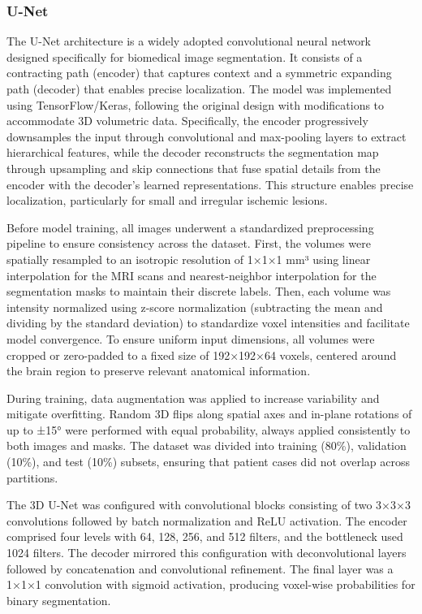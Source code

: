 \documentclass[12pt]{article}
\begin{document}
\subsubsection{U-Net} \label{subsec:unet}
The U-Net architecture \cite{ronnebergerUNetConvolutionalNetworks2015} is a widely adopted convolutional neural network designed specifically for biomedical image segmentation. It consists of a contracting path (encoder) that captures context and a symmetric expanding path (decoder) that enables precise localization. The model was implemented using TensorFlow/Keras, following the original design with modifications to accommodate 3D volumetric data. Specifically, the encoder progressively downsamples the input through convolutional and max-pooling layers to extract hierarchical features, while the decoder reconstructs the segmentation map through upsampling and skip connections that fuse spatial details from the encoder with the decoder’s learned representations. This structure enables precise localization, particularly for small and irregular ischemic lesions.

Before model training, all images underwent a standardized preprocessing pipeline to ensure consistency across the dataset. First, the volumes were spatially resampled to an isotropic resolution of 1×1×1 mm³ using linear interpolation for the MRI scans and nearest-neighbor interpolation for the segmentation masks to maintain their discrete labels. Then, each volume was intensity normalized using z-score normalization (subtracting the mean and dividing by the standard deviation) to standardize voxel intensities and facilitate model convergence. To ensure uniform input dimensions, all volumes were cropped or zero-padded to a fixed size of 192×192×64 voxels, centered around the brain region to preserve relevant anatomical information.

During training, data augmentation was applied to increase variability and mitigate overfitting. Random 3D flips along spatial axes and in-plane rotations of up to ±15° were performed with equal probability, always applied consistently to both images and masks. The dataset was divided into training (80\%), validation (10\%), and test (10\%) subsets, ensuring that patient cases did not overlap across partitions.

The 3D U-Net was configured with convolutional blocks consisting of two 3×3×3 convolutions followed by batch normalization and ReLU activation. The encoder comprised four levels with 64, 128, 256, and 512 filters, and the bottleneck used 1024 filters. The decoder mirrored this configuration with deconvolutional layers followed by concatenation and convolutional refinement. The final layer was a 1×1×1 convolution with sigmoid activation, producing voxel-wise probabilities for binary segmentation.
\end{document}
